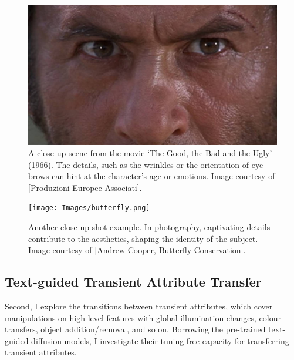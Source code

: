 
\begin{figure}[ht]
  \centering

    \includegraphics[width=0.78\linewidth]{Images/A scene from ‘The Good, the Bad and the Ugly’ (1966). Image courtesy- Produzioni Europee Associati .jpg}

   \caption{A close-up scene from the movie ‘The Good, the Bad and the Ugly’ (1966). The details, such as the wrinkles or the orientation of eye brows can hint at the character's age or emotions. Image courtesy of [Produzioni Europee Associati].}
   \label{fig:close-up1}
\end{figure}


\begin{figure}%
  \centering
   \texttt{[image: Images/butterfly.png]}
   
   \caption{Another close-up shot example. In photography, captivating details contribute to the aesthetics, shaping the identity of the subject. Image courtesy of [Andrew Cooper, Butterfly Conservation].}
   \label{fig:close-up2}
\end{figure}


\newpage
\subsection{Text-guided Transient Attribute Transfer} 
Second, I explore the transitions between transient attributes, which cover manipulations on high-level features with global illumination changes, colour transfers, object addition/removal, and so on. Borrowing the pre-trained text-guided diffusion models, I investigate their tuning-free capacity for transferring transient attributes.

